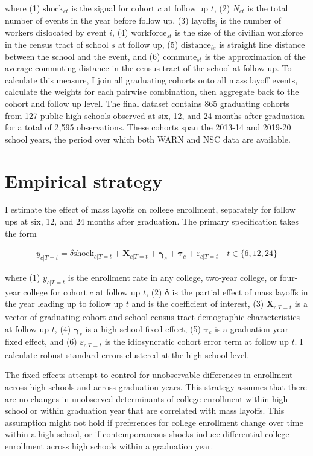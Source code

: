 \documentclass[12pt,letterpaper]{article}
\begin{document}
where (1) $\text{shock}_{ct}$ is the signal for cohort $c$ at follow up $t$, (2) $N_{ct}$ is the total number of events in the year before follow up, (3) $\text{layoffs}_{i}$ is the number of workers dislocated by event $i$, (4) $\text{workforce}_{st}$ is the size of the civilian workforce in the census tract of school $s$ at follow up, (5) $\text{distance}_{is}$ is straight line distance between the school and the event, and (6) $\text{commute}_{st}$ is the approximation of the average commuting distance in the census tract of the school at follow up. To calculate this measure, I join all graduating cohorts onto all mass layoff events, calculate the weights for each pairwise combination, then aggregate back to the cohort and follow up level. The final dataset contains 865 graduating cohorts from 127 public high schools observed at six, 12, and 24 months after graduation for a total of 2,595 observations. These cohorts span the 2013-14 and 2019-20 school years, the period over which both WARN and NSC data are available.

\section{Empirical strategy}

I estimate the effect of mass layoffs on college enrollment, separately for follow ups at six, 12, and 24 months after graduation. The primary specification takes the form

\begin{align}
  y_{c|T=t} = \delta\text{shock}_{c|T=t} + \boldsymbol{X}_{c|T=t} + \boldsymbol{\gamma}_{s} + \boldsymbol{\tau}_{c} + \varepsilon_{c|T=t} \quad t \in \{6, 12, 24\}
\end{align}

where (1) $y_{c|T=t}$ is the enrollment rate in any college, two-year college, or four-year college for cohort $c$ at follow up $t$, (2) $\boldsymbol{\delta}$ is the partial effect of mass layoffs in the year leading up to follow up $t$ and is the coefficient of interest, (3) $\boldsymbol{X}_{c|T=t}$ is a vector of graduating cohort and school census tract demographic characteristics at follow up $t$, (4) $\boldsymbol{\gamma}_{s}$ is a high school fixed effect, (5) $\boldsymbol{\tau}_{c}$ is a graduation year fixed effect, and (6) $\varepsilon_{c|T=t}$ is the idiosyncratic cohort error term at follow up $t$. I calculate robust standard errors clustered at the high school level.

The fixed effects attempt to control for unobservable differences in enrollment across high schools and across graduation years. This strategy assumes that there are no changes in unobserved determinants of college enrollment within high school or within graduation year that are correlated with mass layoffs. This assumption might not hold if preferences for college enrollment change over time within a high school, or if contemporaneous shocks induce differential college enrollment across high schools within a graduation year.
\end{document}

